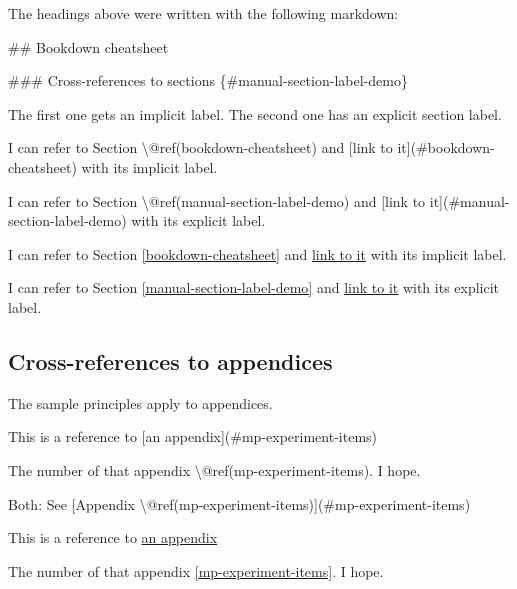 \documentclass [11pt, proquest] {uwthesis}[2015/03/03]
\newenvironment{Shaded}{}{}
\newcommand{\OtherTok}[1]{\textcolor[rgb]{0.00,0.44,0.13}{{#1}}}
\newcommand{\FunctionTok}[1]{\textcolor[rgb]{0.02,0.16,0.49}{{#1}}}
\newcommand{\NormalTok}[1]{{#1}}
\begin{document}
The headings above were written with the following markdown:
\begin{Shaded}
\begin{Highlighting}[]
\FunctionTok{## Bookdown cheatsheet}

\FunctionTok{### Cross-references to sections \{#manual-section-label-demo\}}
\end{Highlighting}
\end{Shaded}
The first one gets an implicit label. The second one has an explicit
section label.
\begin{Shaded}
\begin{Highlighting}[]
\NormalTok{I can refer to Section \textbackslash{}@ref(bookdown-cheatsheet) and }
\OtherTok{[link to it](#bookdown-cheatsheet)}\NormalTok{ with its implicit label.}

\NormalTok{I can refer to Section \textbackslash{}@ref(manual-section-label-demo) and }
\OtherTok{[link to it](#manual-section-label-demo)}\NormalTok{ with its explicit label.}
\end{Highlighting}
\end{Shaded}
I can refer to Section \ref{bookdown-cheatsheet} and
\protect\hyperlink{bookdown-cheatsheet}{link to it} with its implicit
label.

I can refer to Section \ref{manual-section-label-demo} and
\protect\hyperlink{manual-section-label-demo}{link to it} with its
explicit label.

\subsection{Cross-references to
appendices}\label{cross-references-to-appendices}

The sample principles apply to appendices.
\begin{Shaded}
\begin{Highlighting}[]
\NormalTok{This is a reference to }\OtherTok{[an appendix](#mp-experiment-items)}

\NormalTok{The number of that appendix \textbackslash{}@ref(mp-experiment-items). I hope.}

\NormalTok{Both: See }\OtherTok{[Appendix \textbackslash{}@ref(mp-experiment-items)](#mp-experiment-items)}
\end{Highlighting}
\end{Shaded}
This is a reference to \protect\hyperlink{mp-experiment-items}{an
appendix}

The number of that appendix \ref{mp-experiment-items}. I hope.
\end{document}

